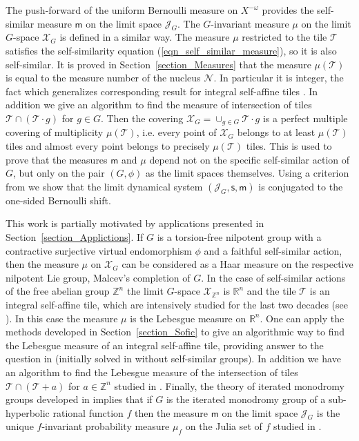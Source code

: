 \documentclass[12pt]{article}
\newcommand{\xmo}{X^{-\omega}}
\newcommand{\limGs}[1][G]{\mathcal{X}_{#1}}
\newcommand{\lims}[1][G]{\mathscr{J}_{#1}}
\newcommand{\si}{\mathsf{s}}
\newcommand{\muls}{\mathsf{m}}
\newcommand{\tile}{\mathscr{T}}
\newcommand{\nucl}{\mathcal{N}}
\theoremstyle{definition}
\begin{document}
The push-forward of the uniform Bernoulli measure on $\xmo$ provides the self-similar measure
$\muls$ on the limit space $\lims$. The $G$-invariant measure $\mu$ on the limit $G$-space $\limGs$
is defined in a similar way. The measure $\mu$ restricted to the tile $\tile$ satisfies the
self-similarity equation (\ref{eqn_self_similar_measure}), so it is also self-similar. It is proved
in Section~\ref{section_Measures} that the measure $\mu(\tile)$ is equal to the measure number of
the nucleus $\nucl$. In particular it is integer, the fact which generalizes corresponding result
for integral self-affine tiles \cite{lag_wang:int_self_affine_I}. In addition we give an algorithm
to find the measure of intersection of tiles $\tile\cap (\tile\cdot g)$ for $g\in G$. Then the
covering $\limGs=\cup_{g\in G}\tile\cdot g$ is a perfect multiple covering of multiplicity
$\mu(\tile)$, i.e. every point of $\limGs$ belongs to at least $\mu(\tile)$ tiles and almost every
point belongs to precisely $\mu(\tile)$ tiles. This is used to prove that the measures $\muls$ and
$\mu$ depend not on the specific self-similar action of $G$, but only on the pair $(G,\phi)$ as the
limit spaces themselves. Using a criterion from \cite{hoffman:Bernoulli} we show that the limit
dynamical system $(\lims,\si,\muls)$ is conjugated to the one-sided Bernoulli shift.

This work is partially motivated by applications presented in Section~\ref{section_Applictions}. If
$G$ is a torsion-free nilpotent group with a contractive surjective virtual endomorphism $\phi$ and
a faithful self-similar action, then the measure $\mu$ on $\limGs$ can be considered as a Haar
measure on the respective nilpotent Lie group, Malcev's completion of $G$. In the case of
self-similar actions of the free abelian group $\mathbb{Z}^n$ the limit $G$-space
$\limGs[\mathbb{Z}^n]$ is $\mathbb{R}^n$ and the tile $\tile$ is an integral self-affine tile,
which are intensively studied for the last two decades (see \cite{lag_wang:self_affine,
vince:digit, lag_wang:int_self_affine_I,lag_wang:int_self_affine_II,he_hui:self_affine}). In this
case the measure $\mu$ is the Lebesgue measure on $\mathbb{R}^n$. One can apply the methods
developed in Section~\ref{section_Sofic} to give an algorithmic way to find the Lebesgue measure of
an integral self-affine tile, providing answer to the question in \cite{lag_wang:int_self_affine_I}
(initially solved in \cite{gab_yu:natur_til} without self-similar groups). In addition we have an
algorithm to find the Lebesgue measure of the intersection of tiles $\tile\cap (\tile+a)$ for
$a\in\mathbb{Z}^n$ studied in \cite{gab_yu:natur_til,int_two_tiles}. Finally, the theory of
iterated monodromy groups developed in \cite{self_sim_groups} implies that if $G$ is the iterated
monodromy group of a sub-hyperbolic rational function $f$ then the measure $\muls$ on the limit
space $\lims$ is the unique $f$-invariant probability measure $\mu_f$ on the Julia set of $f$
studied in \cite{invmeas_rat,lub:entr_ration,rational_bernoulli}.
\end{document}
